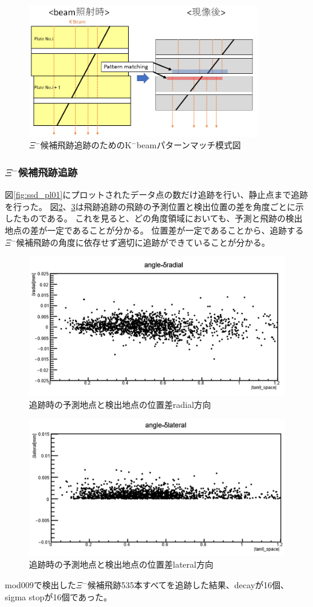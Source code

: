 \documentclass[12pt,a4paper]{jarticle}
\begin{document}
\begin{figure}[htbp]
  \centering
     \includegraphics[width=100mm]{beam_mosikizu.png}
  \caption{$\Xi$$^-$候補飛跡追跡のためのK$^-$beamパターンマッチ模式図\label{fig:beam_mosikizu2}}
\end{figure}
\newpage
\subsubsection{$\Xi$$^-$候補飛跡追跡}
図\ref{fig:ssd_pl01}にプロットされたデータ点の数だけ追跡を行い、静止点まで追跡を行った。
図\ref{fig:tan_razial}、\ref{fig:tan_latelal}は飛跡追跡の飛跡の予測位置と検出位置の差を角度ごとに示したものである。
これを見ると、どの角度領域においても、予測と飛跡の検出地点の差が一定であることが分かる。
位置差が一定であることから、追跡する$\Xi$$^-$候補飛跡の角度に依存せず適切に追跡ができていることが分かる。
\begin{figure}[htbp]
  \centering
     \includegraphics[width=120mm]{radial.png}
  \caption{追跡時の予測地点と検出地点の位置差radial方向\label{fig:tan_razial}}
\end{figure}
\begin{figure}[htbp]
  \centering
     \includegraphics[width=120mm]{lateral.png}
  \caption{追跡時の予測地点と検出地点の位置差lateral方向\label{fig:tan_latelal}}
\end{figure}
\par
mod009で検出した$\Xi$$^-$候補飛跡535本すべてを追跡した結果、decayが16個、sigma stopが16個であった。
\end{document}
